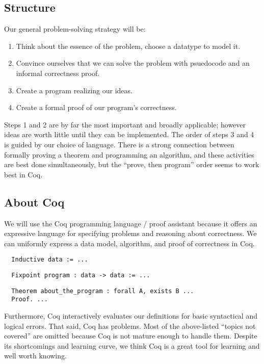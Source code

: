 \documentclass{article}
\begin{document}
\subsection*{Structure}
Our general problem-solving strategy will be:
\begin{enumerate}
\item Think about the essence of the problem, choose a datatype to model it.
\item Convince ourselves that we can solve the problem with psuedocode and an informal correctness proof.
\item Create a program realizing our ideas.
\item Create a formal proof of our program's correctness.
\end{enumerate}

Steps 1 and 2 are by far the most important and broadly applicable; however ideas are worth little until they can be implemented.
The order of steps 3 and 4 is guided by our choice of language.
There is a strong connection between formally proving a theorem and programming an algorithm, and these activities are best done simultaneously, but the ``prove, then program'' order seems to work best in Coq.

\subsection*{About Coq}
We will use the Coq programming language / proof assistant because it offers an expressive language for specifying problems and reasoning about correctness.
We can uniformly express a data model, algorithm, and proof of correctness in Coq.

\begin{center}
\begin{verbatim}
  Inductive data := ...
\end{verbatim}
\begin{verbatim}
  Fixpoint program : data -> data := ...
\end{verbatim}
\begin{verbatim}
  Theorem about_the_program : forall A, exists B ... 
  Proof. ...
\end{verbatim}
\end{center}

Furthermore, Coq interactively evaluates our definitions for basic syntactical and logical errors.
That said, Coq has problems.
Most of the above-listed ``topics not covered'' are omitted because Coq is not mature enough to handle them.
Despite its shortcomings and learning curve, we think Coq is a great tool for learning and well worth knowing.
\end{document}
